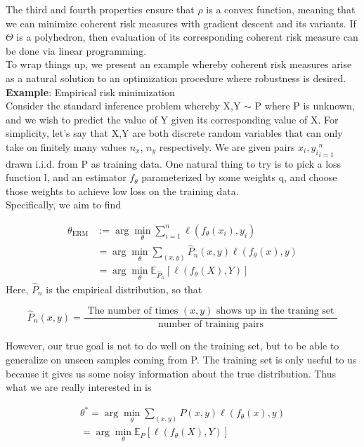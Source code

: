 \documentclass[twoside]{article}
\begin{document}
The third and fourth properties ensure that $\rho$ is a convex function, meaning that we can minimize coherent risk measures with gradient descent and its variants. If $\Theta$ is a polyhedron, then evaluation of its corresponding coherent risk measure can be done via linear programming.\\
To wrap things up, we present an example whereby coherent risk measures arise as a natural solution to an optimization procedure where robustness is desired.\\

\textbf{Example}: Empirical risk minimization\\
Consider the standard inference problem whereby X,Y $\sim$ P where P is unknown, and we wish to predict the value of Y given its corresponding value of X. For simplicity, let’s say that X,Y are both discrete random variables that can only take on finitely many values $n_x$, $n_y$ respectively. We are given pairs ${x_i, y_i}^n_{i=1}$ drawn i.i.d. from P as training data. One natural thing to try is to pick a loss function l, and an estimator $f_\theta$ parameterized by some weights q, and choose those weights to achieve low loss on the training data.\\
Specifically, we aim to find


$$ 
\begin{aligned} \theta_{\mathrm{ERM}} & :=\arg \min _{\theta} \sum_{i=1}^{n} \ell\left(f_{\theta}\left(x_{i}\right), y_{i}\right) \\ &=\arg \min _{\theta} \sum_{(x, y)} \hat{P}_{n}(x, y) \ell\left(f_{\theta}(x), y\right) \\ &=\arg \min _{\theta} \mathbb{E}_{\hat{P}_{n}}\left[\ell\left(f_{\theta}(X), Y\right)\right] \end{aligned}
 $$
Here, $ \hat{P}_{n}$ is the empirical distribution, so that

 $$ 
\hat{P}_{n}(x, y)=\frac{\text { The number of times }(x, y) \text { shows up in the traning set }}{\text { number of training pairs }}
 $$


However, our true goal is not to do well on the training set, but to be able to generalize on unseen samples coming from P. The training set is only useful to us because it gives us some noisy information about the true distribution. Thus what we are really interested in is

$$ 
\begin{aligned}
\theta^{*}=\arg \min _{\theta} \sum_{(x, y)} P(x, y) \ell\left(f_{\theta}(x), y\right)\\
=\arg \min _{\theta} \mathbb{E}_{P}\left[\ell\left(f_{\theta}(X), Y\right)\right] \end{aligned}
 $$
\end{document}
